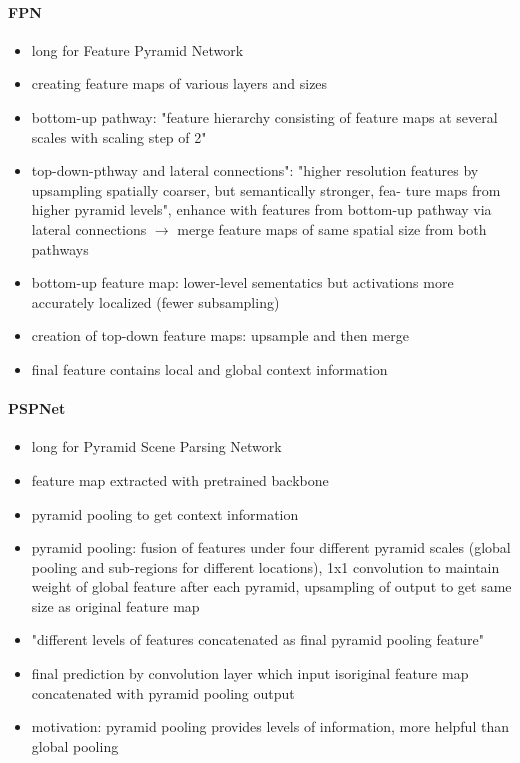 \paragraph{FPN}

\begin{itemize}
	\item long for Feature Pyramid Network
	\item creating feature maps of various layers and sizes \cite{Norelyaqine2023}
	\item bottom-up pathway: "feature hierarchy consisting of feature maps at several scales with scaling step of 2"\cite{fpn}
	\item top-down-pthway and lateral connections": "higher resolution features by upsampling spatially coarser, but semantically stronger, fea- ture maps from higher pyramid levels", enhance with features from bottom-up pathway via lateral connections $\rightarrow$ merge feature maps of same spatial size from both pathways\cite{fpn}
	\item bottom-up feature map: lower-level sementatics but activations more accurately localized (fewer subsampling)\cite{fpn}
	\item creation of top-down feature maps: upsample and then merge\cite{fpn}
	\item final feature contains local and global context information\cite{fpn}
\end{itemize}


\paragraph{PSPNet}

\begin{itemize}
	\item long for Pyramid Scene Parsing Network
	\item feature map extracted with pretrained backbone
	\item pyramid pooling to get context information
	\item pyramid pooling: fusion of features under four different pyramid scales (global pooling and sub-regions for different locations), 1x1 convolution to maintain weight of global feature after each pyramid, upsampling of output to get same size as original feature map
	\item "different levels of features concatenated as final pyramid pooling feature"
	\item final prediction by convolution layer which input isoriginal feature map concatenated with pyramid pooling output
	\item motivation: pyramid pooling provides levels of information, more helpful than global pooling
\end{itemize}

